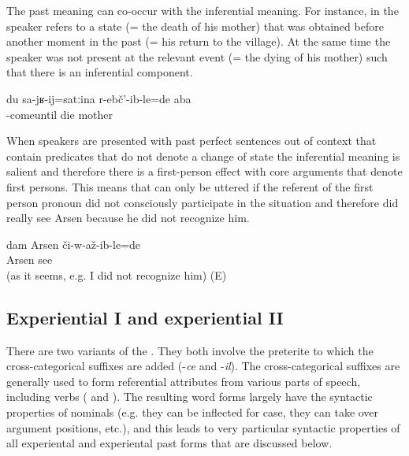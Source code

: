The past  meaning can co-occur with the inferential meaning. For instance, in  the speaker refers to a state (= the death of his mother) that was obtained before another moment in the past (= his return to the village). At the same time the speaker was not present at the relevant event (= the dying of his mother) such that there is an inferential component.

\begin{exe}
	\ex	\label{ex:Before/until I came (home) my mother had already died}
	\gll	du	sa-jʁ-ij=satːina 	r-ebč'-ib-le=de	aba\\
			-comeuntil	die	mother\\
	\glt	{}
\end{exe}

When speakers are presented with past perfect sentences out of context that contain predicates that do not denote a change of state the inferential meaning is salient and therefore there is a first-person effect with core arguments that denote first persons. This means that  can only be uttered if the referent of the first person pronoun did not consciously participate in the situation and therefore did really see Arsen because he did not recognize him.

\begin{exe}
	\ex	\label{ex:I saw Arsen. (as it seems, and e.g. I did not recognize him)}
	\gll	dam	Arsen	či-w-až-ib-le=de\\
			Arsen	see\\
	\glt	{} (as it seems, e.g. I did not recognize him) (E)
\end{exe}



\subsection{Experiential I and experiential II}
\label{ssec:Experiential I and experiential II}

There are two variants of the . They both involve the preterite to which the cross-categorical suffixes are added (-\textit{ce} and -\textit{il}). The cross-categorical suffixes are generally used to form referential attributes from various parts of speech, including verbs ( and ). The resulting word forms largely have the syntactic properties of nominals (e.g. they can be inflected for case, they can take over argument positions, etc.), and this leads to very particular syntactic properties of all experiental and experiental past forms that are discussed below.

